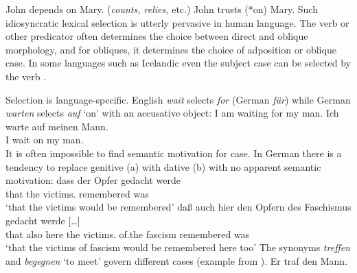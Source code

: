 \begin{exe}
\begin{xlist}[iv.]
\begin{exe}
\begin{xlist}[iv.]
\eal\label{depends-on-ex}
\ex John depends on Mary.  (\emph{counts, relies,} etc.)
\ex John trusts (*on) Mary.  
\ex 
{}
\zl
Such idiosyncratic lexical selection is utterly pervasive in human language.  The verb or other
predicator often determines the choice between direct and oblique morphology, and for obliques, it
determines the choice of adposition or oblique case.  In some languages such as Icelandic even the
subject case can be selected by the verb \citep*{ZMT85a}.

Selection is language-specific.  English \emph{wait} selects \emph{for} (German \emph{für}) while German \emph{warten} selects \emph{auf} `on' with an accusative object:
\eal \label{loureed}
\ex I am waiting for my man.
\ex 
\gll Ich warte auf meinen Mann.\\
     I   wait  on  my     man.\acc\\
\zl
It is often impossible to find semantic motivation for case.  In German there is a
tendency to replace genitive (a) with dative (b) with no apparent semantic motivation:  
\eal
\ex 
\gll dass der Opfer gedacht werde\\
     that the victims.\gen{} remembered was\\
\glt `that the victims would be remembered'
\ex 
\gll daß auch hier den Opfern des Faschismus gedacht werde [\ldots]\footnotemark\\
     that also here the victims.\dat{} of.the fascism remembered was\\
\glt `that the victims of fascism would be remembered here too'
\zl
The synonyms \emph{treffen} and \emph{begegnen} `to meet' govern different cases (example from \citet[]{ps}).
\eal
\ex 
\gll Er traf den Mann.\\

\end{xlist}
\end{exe}
\end{xlist}
\end{exe}
